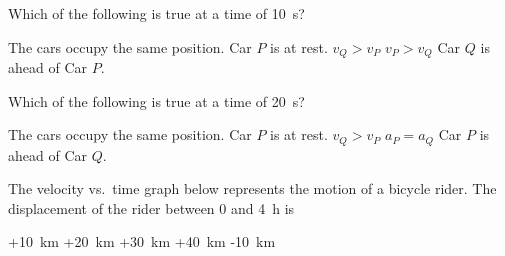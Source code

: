 \documentclass{../../../oss-ap12ibhl-print}
\begin{document}
\begin{questions}

  \question Which of the following is true at a time of \SI{10}{\second}?
  \begin{choices}
    \choice The cars occupy the same position.
    \choice Car $P$ is at rest.
    \choice $v_Q>v_P$
    \choice $v_P>v_Q$
    \choice Car $Q$ is ahead of Car $P$.
  \end{choices}
  \label{q:graph1}
    
  \question Which of the following is true at a time of \SI{20}{\second}?
  \begin{choices}
    \choice The cars occupy the same position.
    \choice Car $P$ is at rest.
    \choice $v_Q>v_P$
    \choice $a_P=a_Q$
    \choice Car $P$ is ahead of Car $Q$.
  \end{choices}
  \label{q:graph2}
  
  \question The velocity vs.\ time graph below represents the motion of a
  bicycle rider. The displacement of the rider between $0$ and \SI{4}{\hour} is

  \begin{minipage}{.4\linewidth}
  \end{minipage}
  \begin{minipage}{.4\linewidth}
    \begin{choices}
      \choice +\SI{10}{\kilo\metre}
      \choice +\SI{20}{\kilo\metre}
      \choice +\SI{30}{\kilo\metre}
      \choice +\SI{40}{\kilo\metre}
      \choice -\SI{10}{\kilo\metre}
    \end{choices}
  \end{minipage}
  \newpage
  

\end{questions}
\end{document}
